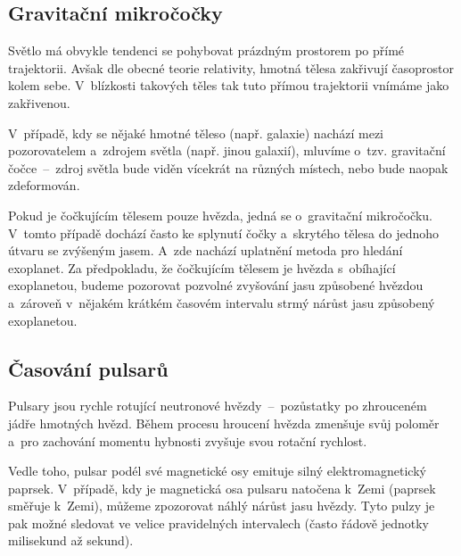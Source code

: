 \documentclass[a4paper,12pt]{article}
\begin{document}
{{{\vspace{-10pt}
\subsection{Gravitační mikročočky}

Světlo má obvykle tendenci se pohybovat prázdným prostorem po přímé trajektorii. Avšak dle obecné teorie relativity, hmotná tělesa zakřivují časoprostor kolem sebe. V~blízkosti takových těles tak tuto přímou trajektorii vnímáme jako zakřivenou.~\cite{methods}


{}

V~případě, kdy se nějaké hmotné těleso (např. galaxie) nachází mezi pozorovatelem a~zdrojem světla (např. jinou galaxií), mluvíme o~tzv. gravitační čočce~--~zdroj světla bude viděn vícekrát na různých místech, nebo bude naopak zdeformován.~\cite{methods}


Pokud je čočkujícím tělesem pouze hvězda, jedná se o~gravitační mikročočku. V~tomto případě dochází často ke splynutí čočky a~skrytého tělesa do jednoho útvaru se zvýšeným jasem. A~zde nachází uplatnění metoda pro hledání exoplanet. Za předpokladu, že čočkujícím tělesem je hvězda s~obíhající exoplanetou, budeme pozorovat pozvolné zvyšování jasu způsobené hvězdou a~zároveň v~nějakém krátkém časovém intervalu strmý nárůst jasu způsobený exoplanetou.~\cite{methods}

\subsection{Časování pulsarů}

Pulsary jsou rychle rotující neutronové hvězdy~--~pozůstatky po zhrouceném jádře hmotných hvězd. Během procesu hroucení hvězda zmenšuje svůj poloměr a~pro zachování momentu hybnosti zvyšuje svou rotační rychlost.~\cite{methods}

Vedle toho, pulsar podél své magnetické osy emituje silný elektromagnetický paprsek. V~případě, kdy je magnetická osa pulsaru natočena k~Zemi (paprsek směřuje k~Zemi), můžeme zpozorovat náhlý nárůst jasu hvězdy. Tyto pulzy je pak možné sledovat ve velice pravidelných intervalech (často řádově jednotky milisekund až sekund).~\cite{methods}

}}}
\end{document}
